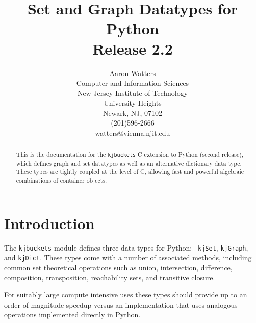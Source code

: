 
%
%
\textwidth=6.5in
\textheight=8.5in
\topmargin=0.0in
\oddsidemargin=0in
\evensidemargin=0in
\pagestyle{myheadings}
\title{Set and Graph Datatypes for Python\\
       Release 2.2}
\author{Aaron Watters\\
	Computer and Information Sciences\\
	New Jersey Institute of Technology\\
	University Heights\\
	Newark, NJ, 07102\\
	(201)596-2666\\
	watters@vienna.njit.edu
	}
\maketitle

\begin{abstract}
This is the documentation for the {\tt kjbuckets} C extension to
Python (second release), 
which defines graph and set datatypes as well as an
alternative dictionary data type.  These types are tightly coupled
at the level of C, allowing fast and powerful algebraic combinations
of container objects.
\end{abstract}

\section{Introduction}

The {\tt kjbuckets} module defines three data types for Python: {\tt
kjSet}, {\tt kjGraph}, and {\tt kjDict}.  These types come with a
number of associated methods, including common set theoretical
operations such as union, intersection, difference, composition,
transposition, reachability sets, and transitive closure.

For suitably large compute intensive uses these types should provide
up to an order of magnitude speedup versus an implementation that uses
analogous operations implemented directly in Python.

